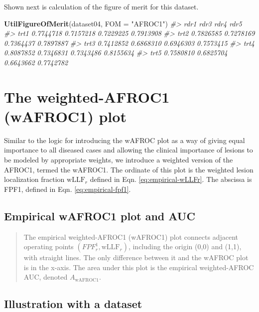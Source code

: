 \documentclass[
]{book}
\newenvironment{Shaded}{\begin{snugshade}}{\end{snugshade}}
\newcommand{\CommentTok}[1]{\textcolor[rgb]{0.56,0.35,0.01}{\textit{#1}}}
\newcommand{\DataTypeTok}[1]{\textcolor[rgb]{0.13,0.29,0.53}{#1}}
\newcommand{\KeywordTok}[1]{\textcolor[rgb]{0.13,0.29,0.53}{\textbf{#1}}}
\newcommand{\NormalTok}[1]{#1}
\newcommand{\StringTok}[1]{\textcolor[rgb]{0.31,0.60,0.02}{#1}}
\begin{document}
Shown next is calculation of the figure of merit for this dataset.

\begin{Shaded}
\begin{Highlighting}[]
\KeywordTok{UtilFigureOfMerit}\NormalTok{(dataset04, }\DataTypeTok{FOM =} \StringTok{"AFROC1"}\NormalTok{)}
\CommentTok{#>           rdr1      rdr3      rdr4      rdr5}
\CommentTok{#> trt1 0.7744718 0.7157218 0.7229225 0.7913908}
\CommentTok{#> trt2 0.7826585 0.7278169 0.7364437 0.7897887}
\CommentTok{#> trt3 0.7412852 0.6868310 0.6946303 0.7573415}
\CommentTok{#> trt4 0.8087852 0.7346831 0.7343486 0.8155634}
\CommentTok{#> trt5 0.7580810 0.6825704 0.6643662 0.7742782}
\end{Highlighting}
\end{Shaded}

\hypertarget{empirical-wAFROC1}{%
\section{The weighted-AFROC1 (wAFROC1) plot}\label{empirical-wAFROC1}}

Similar to the logic for introducing the wAFROC plot as a way of giving equal importance to all diseased cases and allowing the clinical importance of lesions to be modeled by appropriate weights, we introduce a weighted version of the AFROC1, termed the wAFROC1. The ordinate of this plot is the weighted lesion localization fraction \(\text{wLLF}_r\) defined in Eqn. \eqref{eq:empirical-wLLFr}. The abscissa is FPF1, defined in Eqn. \eqref{eq:empirical-fpf1}.

\hypertarget{empirical-definition-empirical-auc-wafroc1}{%
\subsection{Empirical wAFROC1 plot and AUC}\label{empirical-definition-empirical-auc-wafroc1}}

\begin{quote}
The empirical weighted-AFROC1 (wAFROC1) plot connects adjacent operating points \(\left ( FPF_r^1, \text{wLLF}_r \right )\), including the origin (0,0) and (1,1), with straight lines. The only difference between it and the wAFROC plot is in the x-axis. The area under this plot is the empirical weighted-AFROC AUC, denoted \(A_{\text{wAFROC1}}\).
\end{quote}

\hypertarget{empirical-wafroc1-plot-illustration}{%
\subsection{Illustration with a dataset}\label{empirical-wafroc1-plot-illustration}}
\end{document}
